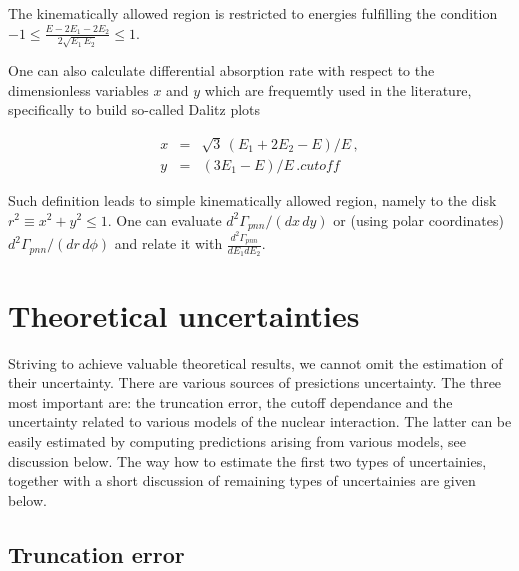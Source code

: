     The kinematically allowed region is restricted to energies fulfilling 
    the condition 
    $ -1 \le \frac{E - 2 E_1 - 2 E_2 }{ 2 \sqrt{ E_1 \, E_2} } \le 1 $.

    One can also calculate differential absorption rate with 
    respect to the dimensionless variables $x$ and $y$
    which are frequemtly used in the literature, specifically to build
    so-called Dalitz plots \cite{Gotta1995}

    \begin{eqnarray}
        x & = & \sqrt{3} \, ( E_1 + 2 E_2 - E ) / E \, , \nonumber \\
        y & = &  ( 3 E_1 - E ) / E \, .
    \label{xy}cutoff
    \end{eqnarray}

    Such definition leads to simple kinematically allowed region, namely to
    the disk $ r^2 \equiv x^2 + y^2 \le 1 $.
    One can evaluate 
    $ {d^2\Gamma_{pnn} }/ \left( {d x \, d y} \right) $
    or (using polar coordinates)
    $ {d^2\Gamma_{pnn} }/ \left( {d r \, d \phi} \right)$
    and relate it with $\frac{d^2\Gamma_{pnn}}{dE_1dE_2}$.

\section{Theoretical uncertainties}

    Striving to achieve valuable theoretical results, we cannot omit the estimation of their
    uncertainty. There are various sources of presictions uncertainty.
    The three most important are: the truncation error, the cutoff dependance and
    the uncertainty related to various models of the nuclear interaction.
    The latter can be easily estimated by computing predictions arising from various 
    models, see discussion below.
    The way how to estimate the first two types of uncertainies, together with a short
    discussion of remaining types of uncertainies are given below. 

    \subsection*{Truncation error}
    \label{sec:trunc}

